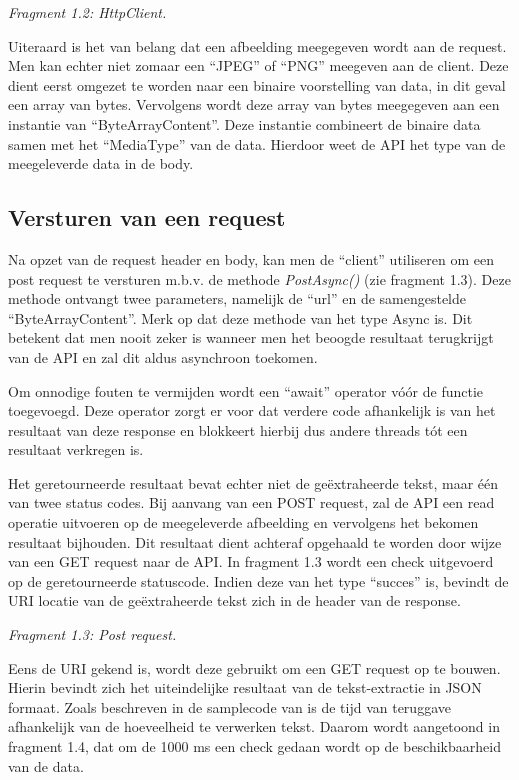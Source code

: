 \newpage

\textit{Fragment 1.2: HttpClient.}




Uiteraard is het van belang dat een afbeelding meegegeven wordt aan de request. Men kan echter niet zomaar een “JPEG” of “PNG” meegeven aan de client. Deze dient eerst omgezet te worden naar een binaire voorstelling van data, in dit geval een array van bytes. Vervolgens wordt deze array van bytes meegegeven aan een instantie van “ByteArrayContent”. Deze instantie combineert de binaire data samen met het “MediaType” van de data. Hierdoor weet de API het type van de meegeleverde data in de body. 
\subsection{Versturen van een request}
Na opzet van de request header en body, kan men de “client” utiliseren om een post request te versturen m.b.v. de methode \textit{PostAsync()} (zie fragment 1.3). Deze methode ontvangt twee parameters, namelijk de “url” en de samengestelde “ByteArrayContent”. Merk op dat deze methode van het type Async is. Dit betekent dat men nooit zeker is wanneer men het beoogde resultaat terugkrijgt van de API en zal dit aldus asynchroon toekomen. 


Om onnodige fouten te vermijden wordt een “await” operator vóór de functie toegevoegd. Deze operator zorgt er voor dat verdere code afhankelijk is van het resultaat van deze response en blokkeert hierbij dus andere threads tót een resultaat verkregen is. 


Het geretourneerde resultaat bevat echter niet de geëxtraheerde tekst, maar één van twee status codes. Bij aanvang van een POST request, zal de API een read operatie uitvoeren op de meegeleverde afbeelding en vervolgens het bekomen resultaat bijhouden. Dit resultaat dient achteraf opgehaald te worden door wijze van een GET request naar de API. In fragment 1.3 wordt een check uitgevoerd op de geretourneerde statuscode. Indien deze van het type “succes” is, bevindt de URI locatie van de geëxtraheerde tekst zich in de header van de response.

\newpage

\textit{Fragment 1.3: Post request.}


Eens de URI gekend is, wordt deze gebruikt om een GET request op te bouwen. Hierin bevindt zich het uiteindelijke resultaat van de tekst-extractie in JSON formaat. Zoals beschreven in de samplecode van \cite{Microsoft2020h} is de tijd van teruggave afhankelijk van de hoeveelheid te verwerken tekst. Daarom wordt aangetoond in fragment 1.4, dat om de 1000 ms een check gedaan wordt op de beschikbaarheid van de data. 




